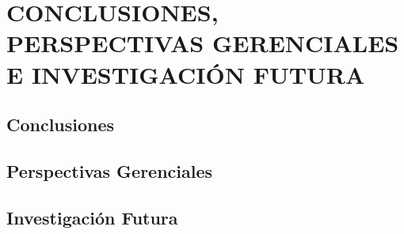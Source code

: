 \chapter{CONCLUSIONES, PERSPECTIVAS GERENCIALES E INVESTIGACIÓN FUTURA}\label{cap:Conclusiones}
    \section{Conclusiones}
    \section{Perspectivas Gerenciales}
    \section{Investigación Futura}